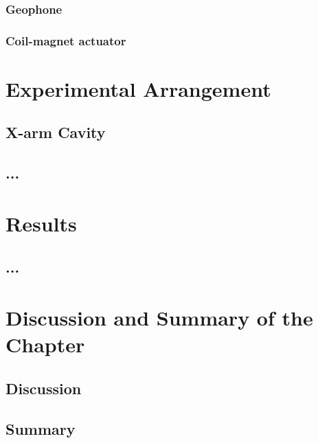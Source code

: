 \subsubsection{Geophone}
\subsubsection{Coil-magnet actuator}




\section{Experimental Arrangement}
\subsection{X-arm Cavity}
\subsection{...}
\section{Results}
\subsection{...}
\section{Discussion and Summary of the Chapter}
\subsection{Discussion}
\subsection{Summary}
